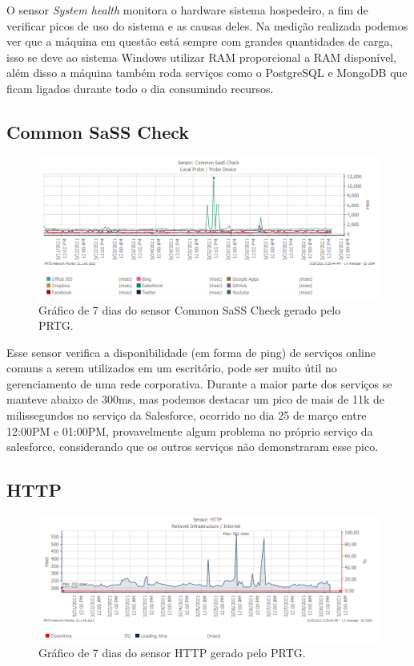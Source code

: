 \documentclass[12pt]{article}
\begin{document}
O sensor \emph{System health} monitora o hardware sistema hospedeiro, a fim de verificar picos de uso do sistema e as causas deles. Na medição realizada podemos ver que a máquina em questão está sempre com grandes quantidades de carga, isso se deve ao sistema Windows utilizar RAM proporcional a RAM disponível, além disso a máquina também roda serviços como o PostgreSQL e MongoDB que ficam ligados durante todo o dia consumindo recursos.

\subsection{Common SaSS Check}

\begin{figure}[H]
    \includegraphics[width=\linewidth]{sass_check.png}
    \caption{Gráfico de 7 dias do sensor Common SaSS Check gerado pelo PRTG.}
\end{figure}

Esse sensor verifica a disponibilidade (em forma de ping) de serviços online comuns a serem utilizados em um escritório, pode ser muito útil no gerenciamento de uma rede corporativa. Durante a maior parte dos serviços se manteve abaixo de 300ms, mas podemos destacar um pico de mais de 11k de milissegundos no serviço da Salesforce, ocorrido no dia 25 de março entre 12:00PM e 01:00PM, provavelmente algum problema no próprio serviço da salesforce, considerando que os outros serviços não demonstraram esse pico.

\subsection{HTTP}

\begin{figure}[H]
    \includegraphics[width=\linewidth]{http.png}
    \caption{Gráfico de 7 dias do sensor HTTP gerado pelo PRTG.}
\end{figure}
\end{document}
